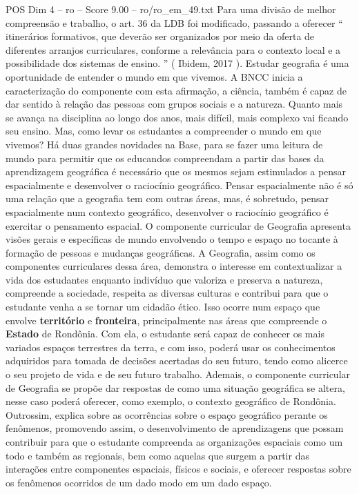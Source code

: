 \begin{textsample}{POS Dim 4 – ro – Score 9.00 – ro/ro\_em\_49.txt}
Para uma divisão de melhor compreensão e trabalho, o art. 36 da LDB foi modificado, passando a oferecer “ itinerários formativos, que deverão ser organizados por meio da oferta de diferentes arranjos curriculares, conforme a relevância para o contexto local e a possibilidade dos sistemas de ensino. ” ( Ibidem, 2017 ).
Estudar geografia é uma oportunidade de entender o mundo em que vivemos.
A BNCC inicia a caracterização do componente com esta afirmação, a ciência, também é capaz de dar sentido à relação das pessoas com grupos sociais e a natureza.
Quanto mais se avança na disciplina ao longo dos anos, mais difícil, mais complexo vai ficando seu ensino.
Mas, como levar os estudantes a compreender o mundo em que vivemos?
Há duas grandes novidades na Base, para se fazer uma leitura de mundo para permitir que os educandos compreendam a partir das bases da aprendizagem geográfica é necessário que os mesmos sejam estimulados a pensar espacialmente e desenvolver o raciocínio geográfico.
Pensar espacialmente não é só uma relação que a geografia tem com outras áreas, mas, é sobretudo, pensar espacialmente num contexto geográfico, desenvolver o raciocínio geográfico é exercitar o pensamento espacial.
O componente curricular de Geografia apresenta visões gerais e específicas de mundo envolvendo o tempo e espaço no tocante à formação de pessoas e mudanças geográficas.
A Geografia, assim como os componentes curriculares dessa área, demonstra o interesse em contextualizar a vida dos estudantes enquanto indivíduo que valoriza e preserva a natureza, compreende a sociedade, respeita as diversas culturas e contribui para que o estudante venha a se tornar um cidadão ético.
Isso ocorre num espaço que envolve \textbf{território} e \textbf{fronteira}, principalmente nas áreas que compreende o \textbf{Estado} de Rondônia.
Com ela, o estudante será capaz de conhecer os mais variados espaços terrestres da terra, e com isso, poderá usar os conhecimentos adquiridos para tomada de decisões acertadas do seu futuro, tendo como alicerce o seu projeto de vida e de seu futuro trabalho.
Ademais, o componente curricular de Geografia se propõe dar respostas de como uma situação geográfica se altera, nesse caso poderá oferecer, como exemplo, o contexto geográfico de Rondônia.
Outrossim, explica sobre as ocorrências sobre o espaço geográfico perante os fenômenos, promovendo assim, o desenvolvimento de aprendizagens que possam contribuir para que o estudante compreenda as organizações espaciais como um todo e também as regionais, bem como aquelas que surgem a partir das interações entre componentes espaciais, físicos e sociais, e oferecer respostas sobre os fenômenos ocorridos de um dado modo em um dado espaço.

\end{textsample}
